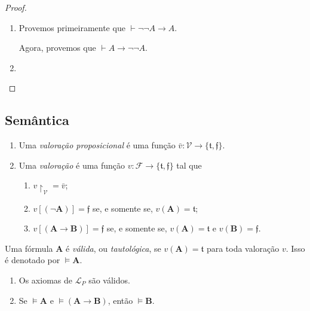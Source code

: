 \begin{proof}
    \leavevmode
        \begin{enumerate}[leftmargin=*, align=left, label=\textbf{(\alph*)}]
            \item Provemos primeiramente que $\vdash \neg \neg A \rightarrow A$.
            
            Agora, provemos que $\vdash A \rightarrow \neg \neg A$.
            \item 
        \end{enumerate}
\end{proof}

\subsection{Semântica}

\begin{definition}
    \leavevmode
        \begin{enumerate}[leftmargin=*, align=left, label=\textbf{(\alph*)}]
            \item Uma \emph{valoração proposicional} é uma função $\bar{v} : \mathcal{V} \to \{\mathfrak{t}, \mathfrak{f} \}$.
            \item Uma \emph{valoração} é uma função $v: \mathcal{F} \to \{\mathfrak{t}, \mathfrak{f} \}$ tal que
                \begin{enumerate}[label=\roman*.]
                    \item $v \restriction_{\mathcal{V}} = \bar{v}$;
                    \item $v[(\neg \mathbf{A})] = \mathfrak{f}$ se, e somente se, $v(\mathbf{A}) = \mathfrak{t}$;
                    \item $v[(\mathbf{A} \rightarrow \mathbf{B})] = \mathfrak{f}$ se, e somente se, $v(\mathbf{A}) = \mathfrak{t}$ e $v(\mathbf{B}) = \mathfrak{f}$.
                \end{enumerate}
        \end{enumerate}
\end{definition}

\begin{definition}
    Uma fórmula $\mathbf{A}$ é \emph{válida}, ou \emph{tautológica}, se $v(\mathbf{A}) = \mathfrak{t}$ para toda valoração $v$. Isso é denotado por $\vDash \mathbf{A}$.
\end{definition}

\begin{lemma} \label{lem.fund:axregrasvalidos}
    \leavevmode
        \begin{enumerate}[leftmargin=*, align=left, label=\textbf{(\alph*)}]
            \item Os axiomas de $\mathcal{L}_P$ são válidos.
            \item Se $\vDash \mathbf{A}$ e $\vDash (\mathbf{A} \rightarrow \mathbf{B})$, então $\vDash \mathbf{B}$.
        \end{enumerate}
\end{lemma}

